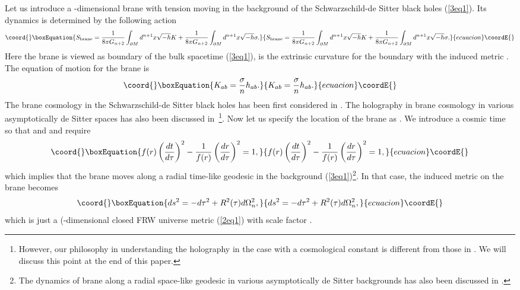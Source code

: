 \documentclass[a4paper,12pt]{article}
\begin{document}
Let us introduce a \coordHE{}-dimensional brane with tension \myHighlight{$\sigma $}\coordHE{} moving
in the background of the Schwarzschild-de Sitter black holes
(\ref{3eq1}). Its dynamics is determined by the following
action~\cite{SV,Wall}
\begin{equation}\coord{}\boxEquation{
\label{3eq6} S_{\rm brane}=\frac{1}{8\pi G_{n+2}}\int_{\partial
M}d^{n+1}x \sqrt{-h}K +\frac{1}{8\pi G_{n+2}}\int_{\partial
M}d^{n+1}x\sqrt{-h} \sigma.
}{
S_{\rm brane}=\frac{1}{8\pi G_{n+2}}\int_{\partial
M}d^{n+1}x \sqrt{-h}K +\frac{1}{8\pi G_{n+2}}\int_{\partial
M}d^{n+1}x\sqrt{-h} \sigma.
}{ecuacion}\coordE{}\end{equation}
Here the brane is viewed as boundary of the bulk spacetime
(\ref{3eq1}), \coordHE{} is the extrinsic curvature for the boundary with
the induced metric \coordHE{}. The equation of motion for the brane is
\begin{equation}\coord{}\boxEquation{
\label{3eq7}
 K_{ab}=\frac{\sigma}{n}h_{ab}.
}{
K_{ab}=\frac{\sigma}{n}h_{ab}.
}{ecuacion}\coordE{}\end{equation}
The brane cosmology in the Schwarzschild-de Sitter black holes has
been first considered in \cite{Ogush}. The holography in brane
cosmology in various asymptotically de Sitter spaces has  also
been discussed in~\cite{Ogush,deSitter}\footnote{However, our philosophy 
in understanding the holography in the case with a cosmological 
constant is different from those in \cite{Ogush,deSitter}. We will discuss this point
at the end of this paper.}.
 Now let us specify the location
of the brane as \coordHE{}. We introduce a cosmic time \myHighlight{$\tau$}\coordHE{} so
that \coordHE{} and \coordHE{} and require
\begin{equation}\coord{}\boxEquation{
\label{3eq8}
 f(r)\left(\frac{dt}{d\tau}\right)^2
 -\frac{1}{f(r)}\left(\frac{dr}{d\tau}\right)^2 =1,
 }{
f(r)\left(\frac{dt}{d\tau}\right)^2
 -\frac{1}{f(r)}\left(\frac{dr}{d\tau}\right)^2 =1,
 }{ecuacion}\coordE{}\end{equation}
 which implies that the brane moves along a radial time-like geodesic
in the background (\ref{3eq1})\footnote{The dynamics of brane
along a radial space-like geodesic in various asymptotically de Sitter 
backgrounds has also been discussed in \cite{Ogush,deSitter}.}. In that case, the
induced metric \coordHE{} on the brane becomes
\begin{equation}\coord{}\boxEquation{
\label{3eq9} ds^2 =-d\tau^2 +R^2(\tau)d\Omega_n^2,
}{
ds^2 =-d\tau^2 +R^2(\tau)d\Omega_n^2,
}{ecuacion}\coordE{}\end{equation}
which is just a (\coordHE{}-dimensional closed FRW universe metric
(\ref{2eq1}) with  scale factor \coordHE{}.
\end{document}

